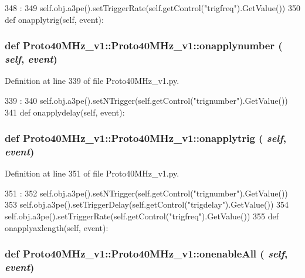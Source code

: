 \begin{DoxyCode}
348                                 :
349         self.obj.a3pe().setTriggerRate(self.getControl("trigfreq").GetValue())
350 
    def onapplytrig(self, event):
\end{DoxyCode}
\hypertarget{classProto40MHz__v1_1_1Proto40MHz__v1_abf7f5c75bf3c940d0aa7b37cc33afa44}{
\subsubsection[{onapplynumber}]{\setlength{\rightskip}{0pt plus 5cm}def Proto40MHz\_\-v1::Proto40MHz\_\-v1::onapplynumber ( {\em self}, \/   {\em event})}}
\label{classProto40MHz__v1_1_1Proto40MHz__v1_abf7f5c75bf3c940d0aa7b37cc33afa44}


Definition at line 339 of file Proto40MHz\_\-v1.py.


\begin{DoxyCode}
339                                   :
340         self.obj.a3pe().setNTrigger(self.getControl("trignumber").GetValue())
341 
    def onapplydelay(self, event):
\end{DoxyCode}
\hypertarget{classProto40MHz__v1_1_1Proto40MHz__v1_a082933d91caeaec0284b668bc18e96a9}{
\subsubsection[{onapplytrig}]{\setlength{\rightskip}{0pt plus 5cm}def Proto40MHz\_\-v1::Proto40MHz\_\-v1::onapplytrig ( {\em self}, \/   {\em event})}}
\label{classProto40MHz__v1_1_1Proto40MHz__v1_a082933d91caeaec0284b668bc18e96a9}


Definition at line 351 of file Proto40MHz\_\-v1.py.


\begin{DoxyCode}
351                                 :
352         self.obj.a3pe().setNTrigger(self.getControl("trignumber").GetValue())
353         self.obj.a3pe().setTriggerDelay(self.getControl("trigdelay").GetValue())
354         self.obj.a3pe().setTriggerRate(self.getControl("trigfreq").GetValue())
355 
    def onapplyaxlength(self, event):
\end{DoxyCode}
\hypertarget{classProto40MHz__v1_1_1Proto40MHz__v1_a16eb9e52e1c93e3eb257371c54e9bbb4}{
\subsubsection[{onenableAll}]{\setlength{\rightskip}{0pt plus 5cm}def Proto40MHz\_\-v1::Proto40MHz\_\-v1::onenableAll ( {\em self}, \/   {\em event})}}
\label{classProto40MHz__v1_1_1Proto40MHz__v1_a16eb9e52e1c93e3eb257371c54e9bbb4}


